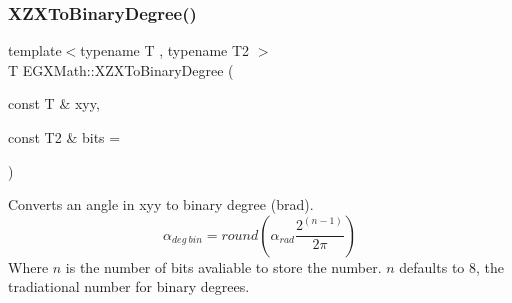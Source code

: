 \subsubsection{\texorpdfstring{X\+Z\+X\+To\+Binary\+Degree()}{XZXToBinaryDegree()}}
{\footnotesize\ttfamily template$<$typename T , typename T2 $>$ \\
T E\+G\+X\+Math\+::\+X\+Z\+X\+To\+Binary\+Degree (\begin{DoxyParamCaption}\item[{const T \&}]{xyy,  }\item[{const T2 \&}]{bits = {} }\end{DoxyParamCaption})}



Converts an angle in xyy to binary degree (brad). \[\alpha_{deg\ bin}=round(\alpha_{rad}\frac{2^{(n-1)}}{2 \pi})\] Where $n$ is the number of bits avaliable to store the number. $n$ defaults to 8, the tradiational number for binary degrees. 

